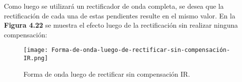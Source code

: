 \noindent Como luego se utilizar\'{a} un rectificador de onda completa, se desea que la rectificaci\'{o}n de cada una de estas pendientes resulte en el mismo valor. En la \textbf{Figura 4.22 }se muestra el efecto luego de la rectificaci\'{o}n sin realizar ninguna compensaci\'{o}n:

\begin{figure}[H]
	\centering
	\texttt{[image: Forma-de-onda-luego-de-rectificar-sin-compensación-IR.png]}
	\caption{Forma de onda luego de rectificar sin compensación IR.}
	\label{fig:img_Forma-de-onda-luego-de-rectificar-sin-compensación-IR}
\end{figure}


